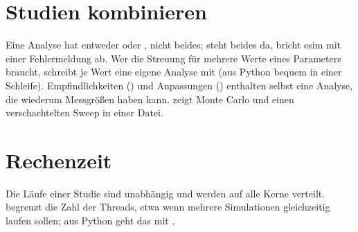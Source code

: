 \section{Studien kombinieren}

Eine Analyse hat entweder  oder , nicht
beides; steht beides da, bricht esim mit einer Fehlermeldung ab. Wer die
Streuung für mehrere Werte eines Parameters braucht, schreibt je Wert eine
eigene Analyse mit  (aus Python bequem in einer Schleife).
Empfindlichkeiten () und Anpassungen () enthalten
selbst eine Analyse, die wiederum Messgrößen haben kann.
 zeigt Monte Carlo und einen
verschachtelten Sweep in einer Datei.

\section{Rechenzeit}

Die Läufe einer Studie sind unabhängig und werden auf alle Kerne verteilt.
 begrenzt die Zahl der Threads, etwa wenn mehrere
Simulationen gleichzeitig laufen sollen; aus Python geht das mit
.
